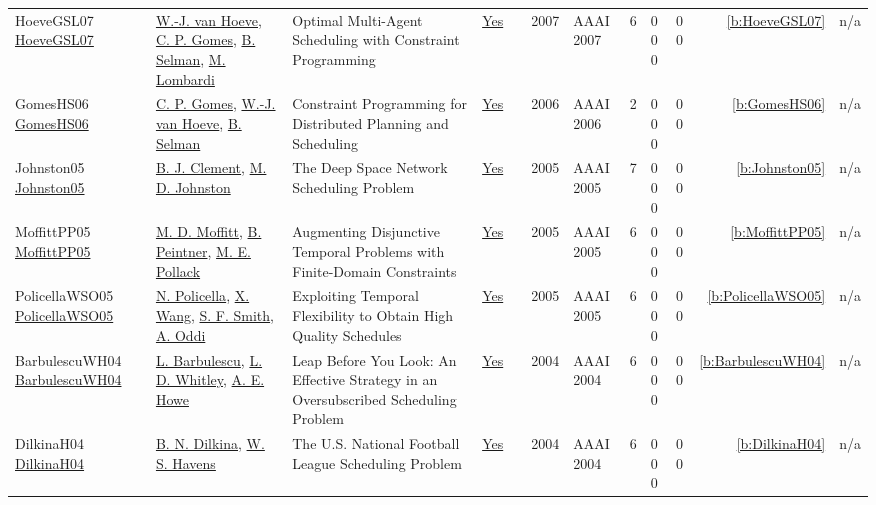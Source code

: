 {\begin{longtable}{>{\raggedright\arraybackslash}p{3cm}>{\raggedright\arraybackslash}p{4.5cm}>{\raggedright\arraybackslash}p{6.0cm}rrrp{2.5cm}rp{1cm}p{1cm}rr}
HoeveGSL07 \href{http://www.aaai.org/Library/AAAI/2007/aaai07-291.php}{HoeveGSL07} & \hyperref[auth:a206]{W.-J. van Hoeve}, \hyperref[auth:a642]{C. P. Gomes}, \hyperref[auth:a643]{B. Selman}, \hyperref[auth:a142]{M. Lombardi} & Optimal Multi-Agent Scheduling with Constraint Programming & \href{../works/HoeveGSL07.pdf}{Yes} & \cite{HoeveGSL07} & 2007 & AAAI 2007 & 6 & 0 0 0 & 0 0 & \ref{b:HoeveGSL07} & n/a\\
GomesHS06 \href{http://www.aaai.org/Library/Symposia/Spring/2006/ss06-04-024.php}{GomesHS06} & \hyperref[auth:a642]{C. P. Gomes}, \hyperref[auth:a206]{W.-J. van Hoeve}, \hyperref[auth:a643]{B. Selman} & Constraint Programming for Distributed Planning and Scheduling & \href{../works/GomesHS06.pdf}{Yes} & \cite{GomesHS06} & 2006 & AAAI 2006 & 2 & 0 0 0 & 0 0 & \ref{b:GomesHS06} & n/a\\
Johnston05 \href{}{Johnston05} & \hyperref[auth:a1342]{B. J. Clement}, \hyperref[auth:a1212]{M. D. Johnston} & The Deep Space Network Scheduling Problem & \href{../works/Johnston05.pdf}{Yes} & \cite{Johnston05} & 2005 & AAAI 2005 & 7 & 0 0 0 & 0 0 & \ref{b:Johnston05} & n/a\\
MoffittPP05 \href{http://www.aaai.org/Library/AAAI/2005/aaai05-188.php}{MoffittPP05} & \hyperref[auth:a771]{M. D. Moffitt}, \hyperref[auth:a772]{B. Peintner}, \hyperref[auth:a773]{M. E. Pollack} & Augmenting Disjunctive Temporal Problems with Finite-Domain Constraints & \href{../works/MoffittPP05.pdf}{Yes} & \cite{MoffittPP05} & 2005 & AAAI 2005 & 6 & 0 0 0 & 0 0 & \ref{b:MoffittPP05} & n/a\\
PolicellaWSO05 \href{http://www.aaai.org/Library/AAAI/2005/aaai05-190.php}{PolicellaWSO05} & \hyperref[auth:a283]{N. Policella}, \hyperref[auth:a1341]{X. Wang}, \hyperref[auth:a298]{S. F. Smith}, \hyperref[auth:a282]{A. Oddi} & Exploiting Temporal Flexibility to Obtain High Quality Schedules & \href{../works/PolicellaWSO05.pdf}{Yes} & \cite{PolicellaWSO05} & 2005 & AAAI 2005 & 6 & 0 0 0 & 0 0 & \ref{b:PolicellaWSO05} & n/a\\
BarbulescuWH04 \href{http://www.aaai.org/Library/AAAI/2004/aaai04-023.php}{BarbulescuWH04} & \hyperref[auth:a1315]{L. Barbulescu}, \hyperref[auth:a1317]{L. D. Whitley}, \hyperref[auth:a1316]{A. E. Howe} & Leap Before You Look: An Effective Strategy in an Oversubscribed Scheduling Problem & \href{../works/BarbulescuWH04.pdf}{Yes} & \cite{BarbulescuWH04} & 2004 & AAAI 2004 & 6 & 0 0 0 & 0 0 & \ref{b:BarbulescuWH04} & n/a\\
DilkinaH04 \href{}{DilkinaH04} & \hyperref[auth:a267]{B. N. Dilkina}, \hyperref[auth:a269]{W. S. Havens} & The {U.S.} National Football League Scheduling Problem & \href{../works/DilkinaH04.pdf}{Yes} & \cite{DilkinaH04} & 2004 & AAAI 2004 & 6 & 0 0 0 & 0 0 & \ref{b:DilkinaH04} & n/a\\

\end{longtable}}
